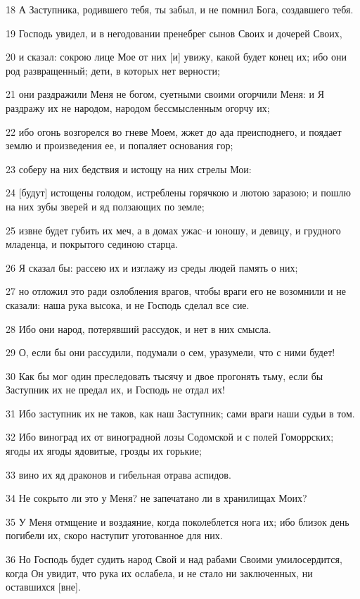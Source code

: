 \par 18 А Заступника, родившего тебя, ты забыл, и не помнил Бога, создавшего тебя.
\par 19 Господь увидел, и в негодовании пренебрег сынов Своих и дочерей Своих,
\par 20 и сказал: сокрою лице Мое от них [и] увижу, какой будет конец их; ибо они род развращенный; дети, в которых нет верности;
\par 21 они раздражили Меня не богом, суетными своими огорчили Меня: и Я раздражу их не народом, народом бессмысленным огорчу их;
\par 22 ибо огонь возгорелся во гневе Моем, жжет до ада преисподнего, и поядает землю и произведения ее, и попаляет основания гор;
\par 23 соберу на них бедствия и истощу на них стрелы Мои:
\par 24 [будут] истощены голодом, истреблены горячкою и лютою заразою; и пошлю на них зубы зверей и яд ползающих по земле;
\par 25 извне будет губить их меч, а в домах ужас--и юношу, и девицу, и грудного младенца, и покрытого сединою старца.
\par 26 Я сказал бы: рассею их и изглажу из среды людей память о них;
\par 27 но отложил это ради озлобления врагов, чтобы враги его не возомнили и не сказали: наша рука высока, и не Господь сделал все сие.
\par 28 Ибо они народ, потерявший рассудок, и нет в них смысла.
\par 29 О, если бы они рассудили, подумали о сем, уразумели, что с ними будет!
\par 30 Как бы мог один преследовать тысячу и двое прогонять тьму, если бы Заступник их не предал их, и Господь не отдал их!
\par 31 Ибо заступник их не таков, как наш Заступник; сами враги наши судьи в том.
\par 32 Ибо виноград их от виноградной лозы Содомской и с полей Гоморрских; ягоды их ягоды ядовитые, грозды их горькие;
\par 33 вино их яд драконов и гибельная отрава аспидов.
\par 34 Не сокрыто ли это у Меня? не запечатано ли в хранилищах Моих?
\par 35 У Меня отмщение и воздаяние, когда поколеблется нога их; ибо близок день погибели их, скоро наступит уготованное для них.
\par 36 Но Господь будет судить народ Свой и над рабами Своими умилосердится, когда Он увидит, что рука их ослабела, и не стало ни заключенных, ни оставшихся [вне].
